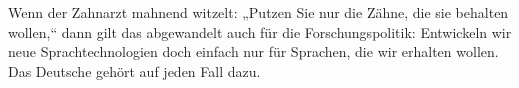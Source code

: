 \begin{multicols}{2}
Wenn der Zahnarzt mahnend witzelt: „Putzen Sie nur die Zähne, die sie behalten wollen,“ dann gilt das abgewandelt auch für die Forschungspolitik: %
Entwickeln wir neue Sprachtechnologien doch einfach nur für Sprachen, die wir erhalten wollen. Das Deutsche gehört auf jeden Fall dazu.





\end{multicols}
